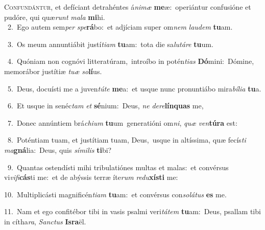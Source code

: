 \lettrine{\initial\textcolor{\initialcolor}{C}}{onfundántur,} et defíciant detrahéntes á\-\textit{ni}\-\textit{mæ} \textbf{me}\-æ:~\star operiántur confusióne et pudóre, qui quæ\textit{runt} \textit{ma}\-\textit{la} \textbf{mi}\-hi.\\
{\numbfont\textcolor{\numbcolor}{~2.}}~Ego autem sem\textit{per} \textit{spe}\-\textbf{rá}bo:~\star et adjíciam super om\textit{nem} \textit{lau}\-\textit{dem} \textbf{tu}\-am.\par
{\numbfont\textcolor{\numbcolor}{~3.}}~Os meum annuntiábit justí\-\textit{ti}\-\textit{am} \textbf{tu}\-am:~\star tota die sa\-\textit{lu}\-\textit{tá}\textit{re} \textbf{tu}\-um.\par
{\numbfont\textcolor{\numbcolor}{~4.}}~Quóniam non cognóvi litteratúram,~\dagger introíbo in potén\-\textit{ti}\-\textit{as} \textbf{Dó}\-mini:~\star Dómine, memorábor justítiæ \textit{tu}\-\textit{æ} \textit{so}\-\textbf{lí}us.\par
{\numbfont\textcolor{\numbcolor}{~5.}}~Deus, docuísti me a juven\-\textit{tú}\-\textit{te} \textbf{me}\-a:~\star et usque nunc pronuntiábo mira\-\textit{bí}\-\textit{li}\textit{a} \textbf{tu}\-a.\par
{\numbfont\textcolor{\numbcolor}{~6.}}~Et usque in senéc\textit{tam} \textit{et} \textbf{sé}\-nium:~\star Deus, \textit{ne} \textit{de}\-\textit{re}\textbf{lín}\textbf{quas} me,\par
{\numbfont\textcolor{\numbcolor}{~7.}}~Donec annúntiem brá\-\textit{chi}\-\textit{um} \textbf{tu}\-um~\star generatióni om\-\textit{ni}\-, \textit{quæ} \textit{ven}\-\textbf{tú}\textbf{ra} est:\par
{\numbfont\textcolor{\numbcolor}{~8.}}~Poténtiam tuam, et justítiam tuam, Deus,~\dagger usque in altíssima, quæ fecís\textit{ti} \textit{ma}\-\textbf{gná}lia:~\star Deus, quis \textit{sí}\-\textit{mi}\textit{lis} \textbf{ti}\-bi?\par
{\numbfont\textcolor{\numbcolor}{~9.}}~Quantas ostendísti mihi tribulatiónes multas et malas:~\dagger et convérsus vi\-\textit{vi}\-\textit{fi}\textbf{cás}ti me:~\star et de abýssis terræ íte\textit{rum} \textit{re}\-\textit{du}\textbf{xís}\textbf{ti} me:\par
{\numbfont\textcolor{\numbcolor}{10.}}~Multiplicásti magnificén\-\textit{ti}\-\textit{am} \textbf{tu}\-am:~\star et convérsus con\-\textit{so}\-\textit{lá}\textit{tus} \textbf{es} me.\par
{\numbfont\textcolor{\numbcolor}{11.}}~Nam et ego confitébor tibi in vasis psalmi veri\-\textit{tá}\-\textit{tem} \textbf{tu}\-am:~\star Deus, psallam tibi in cítha\-\textit{ra}\-, \textit{Sanc}\-\textit{tus} \textbf{Is}\-\textbf{ra}ël.\par
